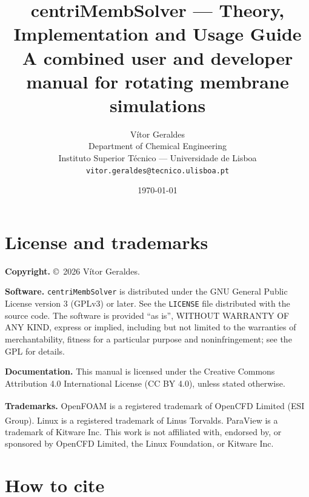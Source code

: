 \documentclass[11pt,a4paper]{article}
\title{\bfseries centriMembSolver — Theory, Implementation and Usage Guide\\[1ex]
	\large A combined user and developer manual for rotating membrane simulations}
\author{
	V\'itor Geraldes\\
	Department of Chemical Engineering\\
	Instituto Superior Técnico — Universidade de Lisboa\\
	\texttt{vitor.geraldes@tecnico.ulisboa.pt}
}
\date{\today}
\begin{document}
	
	\begin{titlepage}
		\maketitle
		\thispagestyle{empty}
	\end{titlepage}
	
	\clearpage
	\thispagestyle{plain}
	
	\section*{License and trademarks}

	\textbf{Copyright.} \copyright\ 2026 V\'itor Geraldes.

	\medskip
	\textbf{Software.}
	\texttt{centriMembSolver} is distributed under the GNU General Public
	License version 3 (GPLv3) or later. See the \texttt{LICENSE} file
	distributed with the source code. The software is provided ``as is'',
	WITHOUT WARRANTY OF ANY KIND, express or implied, including but not
	limited to the warranties of merchantability, fitness for a particular
	purpose and noninfringement; see the GPL for details.

	\medskip
	\textbf{Documentation.}
	This manual is licensed under the Creative Commons Attribution 4.0
	International License (CC BY 4.0), unless stated otherwise.

	\medskip
	\textbf{Trademarks.}
	OpenFOAM\textsuperscript{\textregistered} is a registered trademark of
	OpenCFD Limited (ESI Group). Linux\textsuperscript{\textregistered} is
	a registered trademark of Linus Torvalds. ParaView is a trademark of
	Kitware Inc. This work is not affiliated with, endorsed by, or
	sponsored by OpenCFD Limited, the Linux Foundation, or Kitware Inc.

	\clearpage
	\thispagestyle{plain}

	\section*{How to cite}
\end{document}
